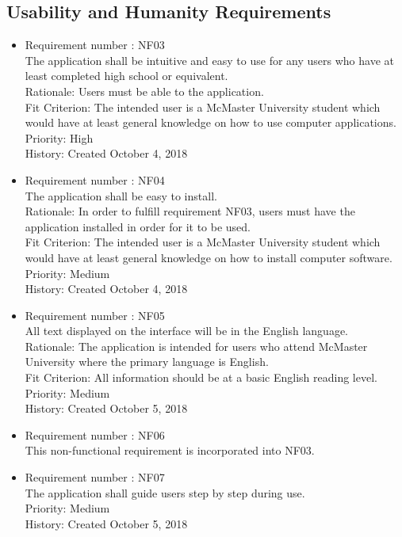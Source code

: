 \documentclass[12pt, titlepage]{article}
\begin{document}
\subsection{Usability and Humanity Requirements}
\begin{itemize}
\item Requirement number : NF03 \\
The application shall be intuitive and easy to use for any users who have at least completed high school or equivalent.\\
Rationale: Users must be able to the application.\\
Fit Criterion: The intended user is a McMaster University student which would have at least general knowledge on how to use computer applications.\\
Priority: High\\
History: Created October 4, 2018

\item Requirement number : NF04 \\
The application shall be easy to install.\\
Rationale: In order to fulfill requirement NF03, users must have the application installed in order for it to be used.\\
Fit Criterion: The intended user is a McMaster University student which would have at least general knowledge on how to install computer software.\\
Priority: Medium\\
History: Created October 4, 2018

\item Requirement number : NF05\\
All text displayed on the interface will be in the English language.\\
Rationale: The application is intended for users who attend McMaster University where the primary language is English.\\
Fit Criterion: All information should be at a basic English reading level.\\
Priority: Medium\\
History: Created October 5, 2018

\item Requirement number : NF06 \\
\color{blue}
This non-functional requirement is incorporated into NF03.


\item Requirement number : NF07\\
The application shall guide users step by step during use.\\
Priority: Medium\\
History: Created October 5, 2018
\color{black}
\end{itemize}
\end{document}
